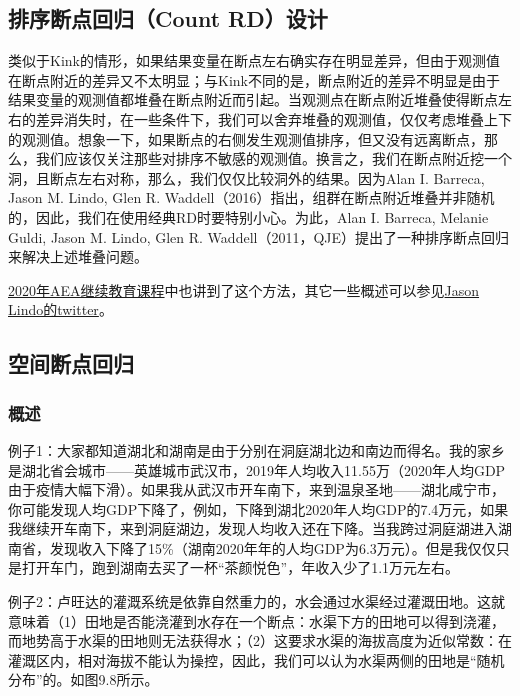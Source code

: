 \documentclass[cn,12pt,math=newtx,citestyle=gb7714-2015,bibstyle=gb7714-2015]{elegantbook}
\begin{document}
	\subsection{排序断点回归（Count RD）设计}
	
	类似于Kink的情形，如果结果变量在断点左右确实存在明显差异，但由于观测值在断点附近的差异又不太明显；与Kink不同的是，断点附近的差异不明显是由于结果变量的观测值都堆叠在断点附近而引起。当观测点在断点附近堆叠使得断点左右的差异消失时，在一些条件下，我们可以舍弃堆叠的观测值，仅仅考虑堆叠上下的观测值。想象一下，如果断点的右侧发生观测值排序，但又没有远离断点，那么，我们应该仅关注那些对排序不敏感的观测值。换言之，我们在断点附近挖一个洞，且断点左右对称，那么，我们仅仅比较洞外的结果。因为Alan I. Barreca, Jason M. Lindo, Glen R. Waddell（2016）指出，组群在断点附近堆叠并非随机的，因此，我们在使用经典RD时要特别小心。为此，Alan I. Barreca, Melanie Guldi, Jason M. Lindo, Glen R. Waddell（2011，QJE）提出了一种排序断点回归来解决上述堆叠问题。
	
   \href{https://www.aeaweb.org/conference/cont-ed/2020-webcasts}{2020年AEA继续教育课程}中也讲到了这个方法，其它一些概述可以参见\href{https://twitter.com/jasonmlindo/status/1240261010319118336?lang=en}{Jason Lindo的twitter}。
	
	
	\subsection{空间断点回归}
	
	\subsubsection{概述}
	例子1：大家都知道湖北和湖南是由于分别在洞庭湖北边和南边而得名。我的家乡是湖北省会城市——英雄城市武汉市，2019年人均收入11.55万（2020年人均GDP由于疫情大幅下滑）。如果我从武汉市开车南下，来到温泉圣地——湖北咸宁市，你可能发现人均GDP下降了，例如，下降到湖北2020年人均GDP的7.4万元，如果我继续开车南下，来到洞庭湖边，发现人均收入还在下降。当我跨过洞庭湖进入湖南省，发现收入下降了15\%（湖南2020年年的人均GDP为6.3万元）。但是我仅仅只是打开车门，跑到湖南去买了一杯“茶颜悦色”，年收入少了1.1万元左右。
	
	例子2：卢旺达的灌溉系统是依靠自然重力的，水会通过水渠经过灌溉田地。这就意味着（1）田地是否能浇灌到水存在一个断点：水渠下方的田地可以得到浇灌，而地势高于水渠的田地则无法获得水；（2）这要求水渠的海拔高度为近似常数：在灌溉区内，相对海拔不能认为操控，因此，我们可以认为水渠两侧的田地是“随机分布”的。如图9.8所示。
	
\end{document}
